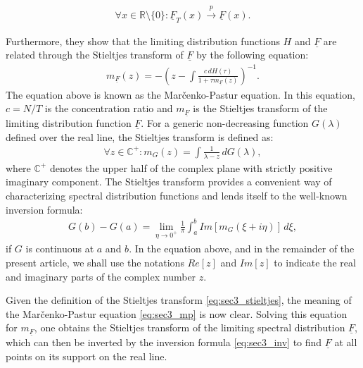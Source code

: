 \begin{align}
	\forall x \in \mathbb{R} \setminus \{0\} : \underline{F}_T(x) \overset{p}{\to} \underline{F}(x).
\end{align}

Furthermore, they show that the limiting distribution functions $H$ and $\underline{F}$ are related through the Stieltjes transform of $\underline{F}$ by the following equation:
\begin{align}
	m_{\underline{F}}(z) = - \left( z - \int \frac{c\, dH(\tau)}{1 + \tau m_{\underline{F}}(z)} \right)^{-1}. \label{eq:sec3_mp}
\end{align}
The equation above is known as the Marčenko-Pastur equation. In this equation, $c=N/T$ is the concentration ratio and $m_{\underline{F}}$ is the Stieltjes transform of the limiting distribution function $\underline{F}$. For a generic non-decreasing function $G(\lambda)$ defined over the real line, the Stieltjes transform is defined as:
\begin{align}
	\forall z \in \mathbb{C}^{+} : m_{G}(z) = \int \frac{1}{\lambda - z} \, dG(\lambda), \label{eq:sec3_stieltjes}
\end{align}
where $\mathbb{C}^{+}$ denotes the upper half of the complex plane with strictly positive imaginary component. The Stieltjes transform provides a convenient way of characterizing spectral distribution functions and lends itself to the well-known inversion formula:
\begin{align}
	G(b) - G(a) = \lim_{\eta \to 0^{+}} \frac{1}{\pi} \int_{a}^b Im[m_G(\xi + i\eta)]\, d\xi, \label{eq:sec3_inv}
\end{align}
if $G$ is continuous at $a$ and $b$. In the equation above, and in the remainder of the present article, we shall use the notations $Re[z]$ and $Im[z]$ to indicate the real and imaginary parts of the complex number $z$.

Given the definition of the Stieltjes transform \eqref{eq:sec3_stieltjes}, the meaning of the Marčenko-Pastur equation \eqref{eq:sec3_mp} is now clear. Solving this equation for $m_{\underline{F}}$, one obtains the Stieltjes transform of the limiting spectral distribution $\underline{F}$, which can then be inverted by the inversion formula \eqref{eq:sec3_inv} to find $\underline{F}$ at all points on its support on the real line.

